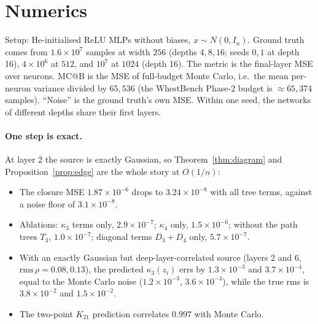 \documentclass[11pt]{article}
\theoremstyle{definition}
\theoremstyle{remark}
\begin{document}
\section{Numerics}\label{sec:num}
Setup: He-initialised ReLU MLPs without biases, $x\sim N(0,I_n)$. Ground truth comes from $1.6\times10^7$ samples at width $256$ (depths $4,8,16$; seeds $0,1$ at depth 16), $4\times10^6$ at $512$, and $10^7$ at $1024$ (depth 16). The metric is the final-layer MSE over neurons. MC@B is the MSE of full-budget Monte Carlo, i.e.\ the mean per-neuron variance divided by $65{,}536$ (the WhestBench Phase-2 budget is $\approx65{,}374$ samples). ``Noise'' is the ground truth's own MSE. Within one seed, the networks of different depths share their first layers.

\paragraph{One step is exact.} At layer 2 the source is exactly Gaussian, so Theorem~\ref{thm:diagram} and Proposition~\ref{prop:edge} are the whole story at $O(1/n)$:
\begin{itemize}
\item The closure MSE $1.87\times10^{-6}$ drops to $3.24\times10^{-8}$ with all tree terms, against a noise floor of $3.1\times10^{-8}$.
\item Ablations: $\kappa_3$ terms only, $2.9\times10^{-7}$; $\kappa_4$ only, $1.5\times10^{-6}$; without the path trees $T_3$, $1.0\times10^{-7}$; diagonal terms $D_3+D_4$ only, $5.7\times10^{-7}$.
\item With an exactly Gaussian but deep-layer-correlated source (layers 2 and 6, $\mathrm{rms}\,\rho=0.08,0.13$), the predicted $\kappa_3(z_i)$ errs by $1.3\times10^{-3}$ and $3.7\times10^{-4}$, equal to the Monte Carlo noise ($1.2\times10^{-3}$, $3.6\times10^{-4}$), while the true rms is $3.8\times10^{-2}$ and $1.5\times10^{-2}$.
\item The two-point $K_{21}$ prediction correlates $0.997$ with Monte Carlo.
\end{itemize}
\end{document}
